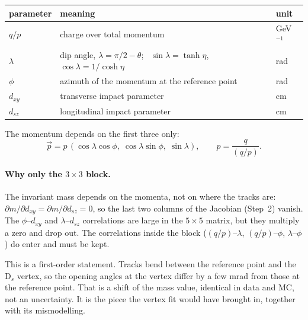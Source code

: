 \documentclass[11pt,a4paper]{article}
\newcommand{\qp}{(q/p)}
\newcommand{\vb}[1]{\vec{#1}}
\begin{document}
\begin{center}
\begin{tabular}{lll}
\toprule
parameter & meaning & unit \\
\midrule
$q/p$     & charge over total momentum & GeV$^{-1}$ \\
$\lambda$ & dip angle, $\lambda = \pi/2-\theta$; \ $\sin\lambda=\tanh\eta$, $\cos\lambda = 1/\cosh\eta$ & rad \\
$\phi$    & azimuth of the momentum at the reference point & rad \\
$d_{xy}$  & transverse impact parameter & cm \\
$d_{sz}$  & longitudinal impact parameter & cm \\
\bottomrule
\end{tabular}
\end{center}

The momentum depends on the first three only:
\begin{equation}
  \vb p = p\,(\cos\lambda\cos\phi,\; \cos\lambda\sin\phi,\; \sin\lambda), \qquad p = \frac{q}{\qp}.
  \label{eq:p}
\end{equation}

\paragraph{Why only the $3\times3$ block.} The invariant mass depends on the momenta, not on where the
tracks are: $\partial m/\partial d_{xy} = \partial m/\partial d_{sz} = 0$, so the last two columns of the
Jacobian (Step~2) vanish. The $\phi$--$d_{xy}$ and $\lambda$--$d_{sz}$ correlations are large in the
$5\times5$ matrix, but they multiply a zero and drop out. The correlations inside the block
($\qp$--$\lambda$, $\qp$--$\phi$, $\lambda$--$\phi$) do enter and must be kept.

This is a first-order statement. Tracks bend between the reference point and the D$_s$ vertex, so the
opening angles at the vertex differ by a few mrad from those at the reference point. That is a shift of the
mass value, identical in data and MC, not an uncertainty. It is the piece the vertex fit would have brought
in, together with its mismodelling.
\end{document}
